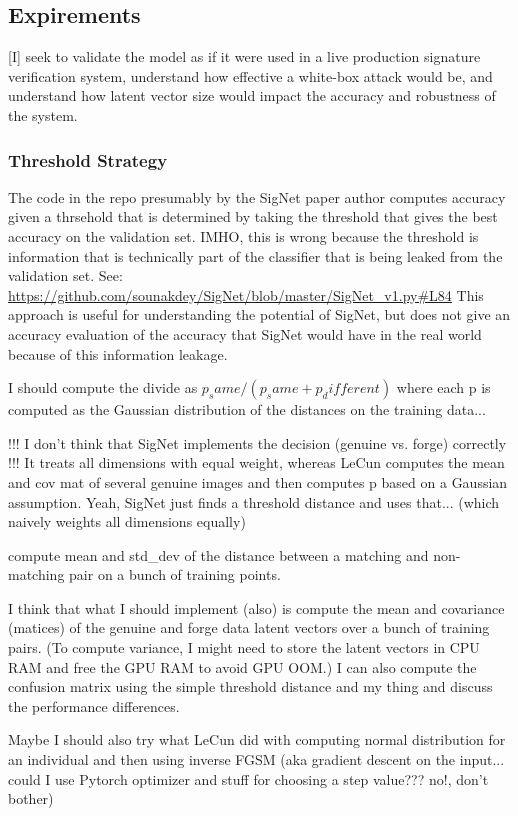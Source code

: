 \subsection{Expirements}

[I] seek to validate the model as if it were used in a live production signature verification system, understand how effective a white-box attack would be, and understand how latent vector size would impact the accuracy and robustness of the system.

\subsubsection{Threshold Strategy}
The code in the repo presumably by the SigNet paper author computes accuracy given a thrsehold that is determined by taking the threshold that gives the best accuracy on the validation set.
IMHO, this is wrong because the threshold is information that is technically part of the classifier that is being leaked from the validation set.
See: \url{https://github.com/sounakdey/SigNet/blob/master/SigNet_v1.py#L84}
This approach is useful for understanding the potential of SigNet, but does not give an accuracy evaluation of the accuracy that SigNet would have in the real world because of this information leakage.


I should compute the divide as $p_same / (p_same + p_different)$ where each p is computed as the Gaussian distribution of the distances on the training data...

!!! I don't think that SigNet implements the decision (genuine vs. forge) correctly !!!
It treats all dimensions with equal weight, whereas LeCun computes the mean and cov mat of several genuine images and then computes p based on a Gaussian assumption.
Yeah, SigNet just finds a threshold distance and uses that... (which naively weights all dimensions equally)

compute mean and std\_dev of the distance between a matching and non-matching pair on a bunch of training points.

I think that what I should implement (also) is compute the mean and covariance (matices) of the genuine and forge data latent vectors over a bunch of training pairs. (To compute variance, I might need to store the latent vectors in CPU RAM and free the GPU RAM to avoid GPU OOM.)
I can also compute the confusion matrix using the simple threshold distance and my thing and discuss the performance differences.

Maybe I should also try what LeCun did with computing normal distribution for an individual and then using inverse FGSM (aka gradient descent on the input... could I use Pytorch optimizer and stuff for choosing a step value??? no!, don't bother)

